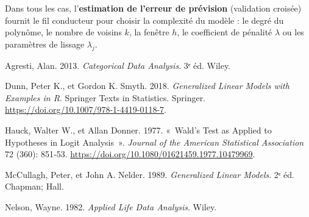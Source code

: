\documentclass[
  french,
  letterpaper,
  DIV=11,
  numbers=noendperiod]{scrreprt}
\newlength{\cslhangindent}
\newenvironment{CSLReferences}[2] %
 {\begin{list}{}{%
  \setlength{\itemindent}{0pt}
  \setlength{\leftmargin}{0pt}
  \setlength{\parsep}{0pt}
  \ifodd #1
   \setlength{\leftmargin}{\cslhangindent}
   \setlength{\itemindent}{-1\cslhangindent}
  \fi
  \setlength{\itemsep}{#2\baselineskip}}}
 {\end{list}}
\begin{document}
Dans tous les cas, l'\textbf{estimation de l'erreur de prévision}
(validation croisée) fournit le fil conducteur pour choisir la
complexité du modèle : le degré du polynôme, le nombre de voisins \(k\),
la fenêtre \(h\), le coefficient de pénalité \(\lambda\) ou les
paramètres de lissage \(\lambda_j\).

\protect{}\label{refs}
\begin{CSLReferences}{1}{1}
Agresti, Alan. 2013. \emph{Categorical Data Analysis}. 3ᵉ éd. Wiley.

Dunn, Peter K., et Gordon K. Smyth. 2018. \emph{Generalized Linear
Models with Examples in {R}}. Springer Texts in Statistics. Springer.
\url{https://doi.org/10.1007/978-1-4419-0118-7}.

Hauck, Walter W., et Allan Donner. 1977. {«~Wald's Test as Applied to
Hypotheses in Logit Analysis~»}. \emph{Journal of the American
Statistical Association} 72 (360): 851‑53.
\url{https://doi.org/10.1080/01621459.1977.10479969}.

McCullagh, Peter, et John A. Nelder. 1989. \emph{Generalized Linear
Models}. 2ᵉ éd. Chapman; Hall.

Nelson, Wayne. 1982. \emph{Applied Life Data Analysis}. Wiley.

\end{CSLReferences}
\end{document}
